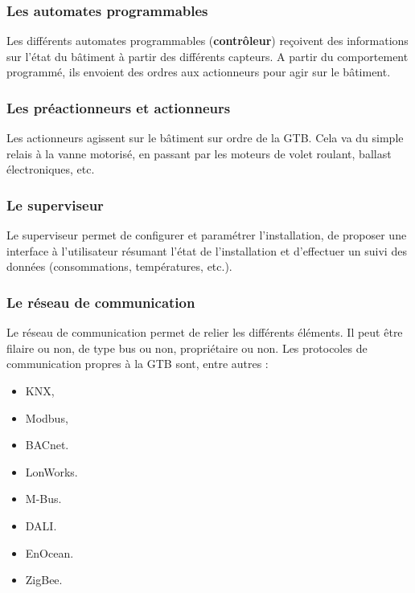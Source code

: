 \subsubsection*{Les automates programmables}
Les différents automates programmables (\textbf{contrôleur}) reçoivent des informations sur l'état du bâtiment à partir des différents capteurs. A partir du comportement programmé, ils envoient des ordres aux actionneurs pour agir sur le bâtiment.

\subsubsection*{Les préactionneurs et actionneurs}
Les actionneurs agissent sur le bâtiment sur ordre de la GTB. Cela va du simple relais à la vanne motorisé, en passant par les moteurs de volet roulant, ballast électroniques, etc. 

\subsubsection*{Le superviseur}
Le superviseur permet de configurer et paramétrer l'installation, de proposer une interface à l'utilisateur résumant l'état de l'installation et d'effectuer un suivi des données (consommations, températures, etc.).

\subsubsection*{Le réseau de communication}
Le réseau de communication permet de relier les différents éléments. Il peut être filaire ou non, de type bus ou non, propriétaire ou non.
Les protocoles de communication propres à la GTB sont, entre autres :
\begin{multicols}{4}
    \begin{itemize}
	\item KNX,
	\item Modbus,
	\item BACnet.
	\item LonWorks.
	\item M-Bus.
	\item DALI.
	\item EnOcean.
	\item ZigBee.
\end{itemize}
\end{multicols}
